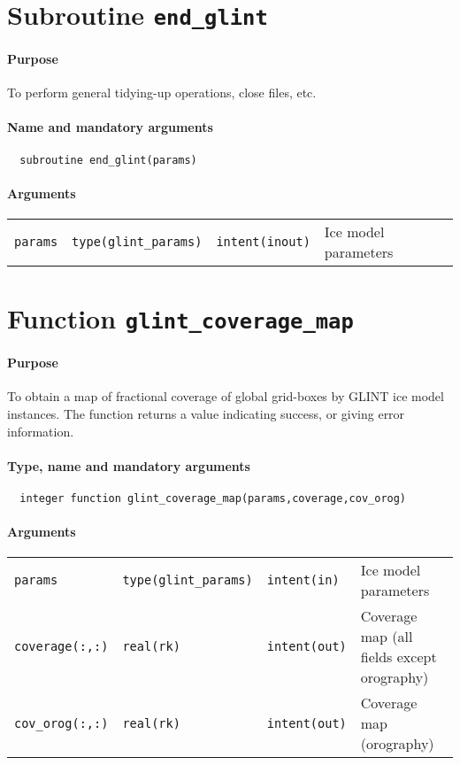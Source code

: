 \section{Subroutine \texttt{end\_glint}}
%
\paragraph{Purpose} To perform general tidying-up operations, close files, etc.
%
\paragraph{Name and mandatory arguments}
%
\begin{verbatim}
  subroutine end_glint(params)
\end{verbatim}
%
\paragraph{Arguments}
%
\begin{center}
\begin{tabular}{llll}
\texttt{params} & \texttt{type(glint\_params)} & \texttt{intent(inout)} & Ice model
parameters \\
\end{tabular}
\end{center}
%
\section{Function \texttt{glint\_coverage\_map}}
%
\paragraph{Purpose} To obtain a map of fractional coverage of global
grid-boxes by GLINT ice model instances. The function returns a value
indicating success, or giving error information.
%
\paragraph{Type, name and mandatory arguments}
%
\begin{verbatim}
  integer function glint_coverage_map(params,coverage,cov_orog)
\end{verbatim}
%
\paragraph{Arguments}
%
\begin{center}
\begin{tabular}{llll}
\texttt{params} & \texttt{type(glint\_params)} & \texttt{intent(in)} & Ice model parameters \\
\texttt{coverage(:,:)} & \texttt{real(rk)} & \texttt{intent(out)} & Coverage
map (all fields except orography) \\
\texttt{cov\_orog(:,:)} & \texttt{real(rk)} & \texttt{intent(out)} & Coverage
map (orography) \\
\end{tabular}
\end{center}
%
